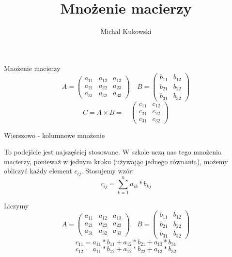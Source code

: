 \documentclass[xcolor={dvipsnames}]{beamer}
\author{Michal Kukowski}
\title[Optymalizacja - mnożenie macierzy]{Mnożenie macierzy}
\date{} %
\begin{document}
\begin{frame}
	\titlepage
\end{frame}

\begin{frame}{Mnożenie macierzy}
\LARGE
	\[
		A = \begin{pmatrix}
			a_{11} & a_{12} & a_{13} \\
			a_{21} & a_{22} & a_{23} \\
			a_{31} & a_{32} & a_{33}
		\end{pmatrix}
		\quad
		B = \begin{pmatrix}
			b_{11} & b_{12} \\
			b_{21} & b_{22}  \\
			b_{31} & b_{32} 
		\end{pmatrix}
	\]
	\vspace{0.3cm}
	\[
		C = A \times B = \quad
		\begin{pmatrix}
			c_{11} & c_{12} \\
			c_{21} & c_{22}  \\
			c_{31} & c_{32} 
		\end{pmatrix}
	\]
\end{frame}

\begin{frame}{Wierszowo - kolumnowe mnożenie}
\LARGE
	\begin{block}{}
		To podejście jest najszęściej stosowane. W szkole uczą nas tego mnożenia macierzy, ponieważ w jednym kroku (używając jednego równania), możemy obliczyć każdy element $c_{ij}$.
		Stosujemy wzór:
		\[ c_{ij}=\displaystyle\sum_{k=1}^n a_{ik} * b_{kj} \]
	\end{block}
\end{frame}

\begin{frame}{Liczymy}
	\LARGE
	\[
		A = \begin{pmatrix}
			a_{11} & a_{12} & a_{13} \\
			a_{21} & a_{22} & a_{23} \\
			a_{31} & a_{32} & a_{33}
		\end{pmatrix}
		\quad
		B = \begin{pmatrix}
			b_{11} & b_{12} \\
			b_{21} & b_{22}  \\
			b_{31} & b_{32} 
		\end{pmatrix}
	\]
	\vspace{0.3cm}
	\[  c_{11} = a_{11} * b_{11} +  a_{12} * b_{21} + a_{13} * b_{31}  \]
	\[  c_{12} = a_{11} * b_{12} +  a_{12} * b_{22} + a_{13} * b_{32}  \]
\end{frame}
\end{document}
